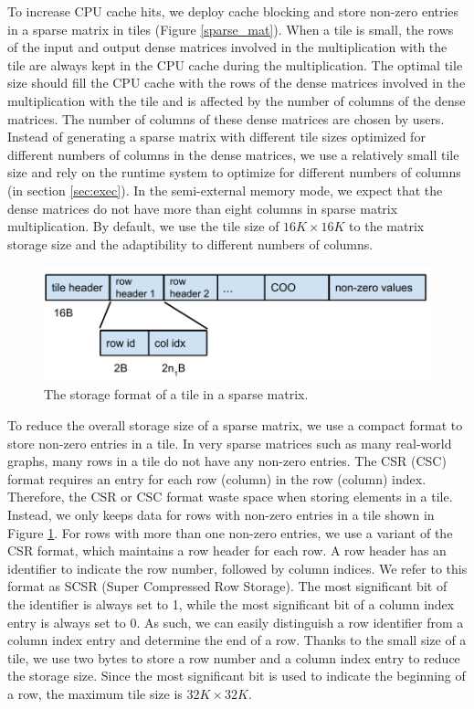 To increase CPU cache hits, we deploy cache blocking \cite{Im04} and store
non-zero entries in a sparse matrix in tiles (Figure \ref{sparse_mat}).
When a tile is small, the rows of the input and output dense matrices
involved in the multiplication with the tile are always kept in the CPU cache
during the multiplication. The optimal tile size should fill the CPU cache
with the rows of the dense matrices involved in the multiplication with
the tile and is affected by the number of columns of the dense matrices.
The number of columns of these dense matrices are chosen by users. Instead
of generating a sparse matrix with
different tile sizes optimized for different numbers of columns in the dense
matrices, we use a relatively small tile size and rely on the runtime system
to optimize for different numbers of columns (in section \ref{sec:exec}).
In the semi-external memory mode, we expect that the dense matrices do not
have more than eight columns in sparse matrix multiplication. By default, we
use the tile size of $16K \times 16K$ to the matrix storage size and
the adaptibility to different numbers of columns.

\begin{figure}
\centering
\includegraphics[scale=0.5]{./tile_format.pdf}
\vspace{-5pt}
\caption{The storage format of a tile in a sparse matrix.}
\vspace{-5pt}
\label{tile_format}
\end{figure}

To reduce the overall storage size of a sparse matrix, we use a compact format
to store non-zero entries in a tile. In very sparse matrices such as
many real-world graphs, many rows in a tile do not have any non-zero entries.
The CSR (CSC) format requires an entry for each row (column) in the row
(column) index. Therefore, the CSR or CSC format waste space when storing elements
in a tile. Instead, we only keeps data for rows with non-zero entries in a tile
shown in Figure \ref{tile_format}. For rows with more than one non-zero entries,
we use a variant of the CSR format, which maintains a row header for each row.
A row header has an identifier to indicate the row number, followed by column
indices. We refer to this format as SCSR (Super Compressed Row Storage).
The most significant bit of the identifier is always set to 1, while the most
significant bit of a column index entry is always set to 0. As such, we can easily
distinguish a row identifier from a column index entry and determine the end
of a row. Thanks to the small size of a tile, we use two bytes to store a row
number and a column index entry to reduce the storage size. Since the most
significant bit is used to indicate the beginning of a row, the maximum tile size
is $32K \times 32K$.

